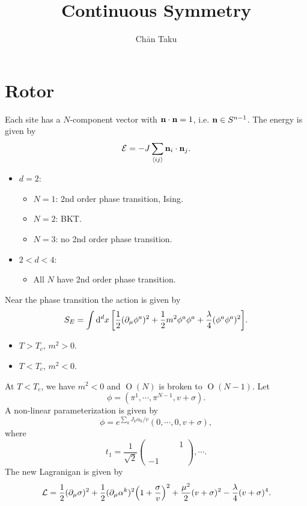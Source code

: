 \documentclass{article}
\title{Continuous Symmetry}
\author{Ch\=an Taku}
\begin{document}
\maketitle

\section{Rotor}

Each site has a $N$-component vector with $\vb{n}\cdot \vb{n} = 1$, i.e. $\vb{n} \in S^{n-1}$.
The energy is given by
\[ \mathcal{E} = -J \sum_{\langle ij \rangle} \vb{n}_i \cdot \vb{n}_j. \]

\begin{itemize}
    \item $d=2$:
    \begin{itemize}
        \item $N=1$: 2nd order phase transition, Ising.
        \item $N=2$: BKT.
        \item $N=3$: no 2nd order phase transition.
    \end{itemize}
    \item $2<d<4$:
    \begin{itemize}
        \item All $N$ have 2nd order phase transition.
    \end{itemize}
\end{itemize}
Near the phase transition the action is given by
\[ S_E = \int \dd[d]{x} \qty[\frac{1}{2}(\partial_\mu \phi^a)^2 + \frac{1}{2}m^2 \phi^a \phi^a + \frac{\lambda}{4}(\phi^a\phi^a)^2]. \]
\begin{itemize}
    \item $T>T_c$, $m^2 > 0$.
    \item $T<T_c$, $m^2 < 0$.
\end{itemize}
At $T<T_c$, we have $m^2 < 0$ and $\operatorname{O}(N)$ is broken to $\operatorname{O}(N-1)$.
Let
\[ \phi = (\pi^1,\cdots,\pi^{N-1},v+\sigma). \]
A non-linear parameterization is given by
\[ \phi = e^{\sum_k J_k \alpha_k/v} (0,\cdots,0,v+\sigma), \]
where
\[ t_1 = \frac{1}{\sqrt{2}} \begin{pmatrix}
    & & & 1 \\
    \\
    \\
    -1 & & &
\end{pmatrix}, \cdots. \]
The new Lagranigan is given by
\[ \mathcal{L} = \frac{1}{2}(\partial_\mu \sigma)^2 + \frac{1}{2}(\partial_\mu \alpha^k)^2 \qty(1+\frac{\sigma}{v})^2 + \frac{\mu^2}{2}(v+\sigma)^2 - \frac{\lambda}{4}(v+\sigma)^4. \]
\end{document}
